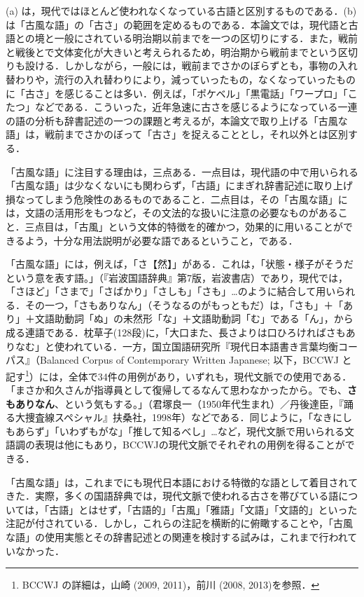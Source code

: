 \documentclass[japanese]{jnlp_1.4}
\begin{document}
(a) は，現代ではほとんど使われなくなっている古語と区別するものである．(b)は「古風な語」の「古さ」の範囲を定めるものである．本論文では，現代語と古語との境と一般にされている明治期以前までを一つの区切りにする．また，戦前と戦後とで文体変化が大きいと考えられるため，明治期から戦前までという区切りも設ける．しかしながら，一般には，戦前までさかのぼらずとも，事物の入れ替わりや，流行の入れ替わりにより，減っていったもの，なくなっていったものに「古さ」を感じることは多い．例えば，「ポケベル」「黒電話」「ワープロ」「こたつ」などである．こういった，近年急速に古さを感じるようになっている一連の語の分析も辞書記述の一つの課題と考えるが，本論文で取り上げる「古風な語」は，戦前までさかのぼって「古さ」を捉えることとし，それ以外とは区別する．

「古風な語」に注目する理由は，三点ある．一点目は，現代語の中で用いられる「古風な語」は少なくないにも関わらず，「古語」にまぎれ辞書記述に取り上げ損なってしまう危険性のあるものであること．二点目は，その「古風な語」には，文語の活用形をもつなど，その文法的な扱いに注意の必要なものがあること．三点目は，「古風」という文体的特徴を的確かつ，効果的に用いることができるよう，十分な用法説明が必要な語であるということ，である．

「古風な語」には，例えば，「さ【然】」がある．これは，「状態・様子がそうだという意を表す語。」（『岩波国語辞典』第7版，岩波書店）であり，現代では，「さほど」「さまで」「さばかり」「さしも」「さも」…のように結合して用いられる．その一つ，「さもありなん」（そうなるのがもっともだ）は，「さも」＋「あり」＋文語助動詞「ぬ」の未然形「な」＋文語助動詞「む」である「ん」，から成る連語である．枕草子(128段)に，「大口また、長さよりは口ひろければさもありなむ」と使われている．一方，国立国語研究所『現代日本語書き言葉均衡コーパス』（Balanced Corpus of Contemporary Written Japanese; 以下，BCCWJ と記す\footnote{BCCWJ の詳細は，山崎 (2009, 2011)，前川 (2008, 2013)を参照．}）には，全体で34件の用例があり，いずれも，現代文脈での使用である．「まさか和久さんが指導員として復帰してるなんて思わなかったから。でも、\textbf{さもありなん}、という気もする。」（君塚良一（1950年代生まれ）／丹後達臣，『踊る大捜査線スペシャル』扶桑社，1998年）などである．同じように，「なきにしもあらず」「いわずもがな」「推して知るべし」…など，現代文脈で用いられる文語調の表現は他にもあり，BCCWJの現代文脈でそれぞれの用例を得ることができる．

「古風な語」は，これまでにも現代日本語における特徴的な語として着目されてきた．実際，多くの国語辞典では，現代文脈で使われる古さを帯びている語については，「古語」とはせず，「古語的」「古風」「雅語」「文語」「文語的」といった注記が付されている．しかし，これらの注記を横断的に俯瞰することや，「古風な語」の使用実態とその辞書記述との関連を検討する試みは，これまで行われていなかった．
\end{document}
